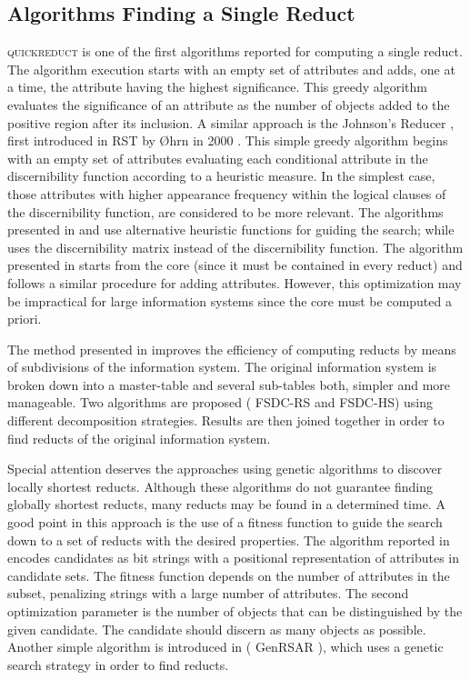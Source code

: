 \documentclass[citenumber]{llncs}
\makeatletter
\newcommand{\setword}[2]{%
  \phantomsection
  #1\def\@currentlabel{\unexpanded{#1}}\label{#2}%
}
\makeatother
\begin{document}
  \subsection{Algorithms Finding a Single Reduct}
  \setword{\textsc{quickreduct}}{quickreduct} \cite{Chouchoulas01} is one of the first algorithms reported for computing a single reduct. The algorithm execution starts with an empty set of attributes and adds, one at a time, the attribute having the highest significance. This greedy algorithm evaluates the significance of an attribute as the number of objects added to the positive region after its inclusion.  A similar approach is the Johnson's Reducer \cite{Johnson74}, first introduced in RST by  \O{}hrn in 2000 \cite{Ohrn00}. This simple greedy algorithm begins with an empty set of attributes evaluating each conditional attribute in the discernibility function according to a heuristic measure. In the simplest case, those attributes with higher appearance frequency within the logical clauses of the discernibility function, are considered to be more relevant. The algorithms presented in \cite{Nguyen97} and \cite{Wang01} use alternative heuristic functions for guiding the search; while \cite{Yang08} uses the discernibility matrix instead of the discernibility function. The algorithm presented in \cite{Zhong01} starts from the core (since it must be contained in every reduct) and follows a similar procedure for adding attributes. However, this optimization may be impractical for large information systems \cite{Jensen14} since the core must be computed a priori.
  
  The method presented in \cite{Jiao10} improves the efficiency of computing reducts by means of subdivisions of the information system. The original information system is broken down into a master-table and several sub-tables both, simpler and more manageable. Two algorithms are proposed (\setword{FSDC-RS}{FSDCRS} and FSDC-HS) using different decomposition strategies. Results are then joined together in order to find reducts of the original information system. 
    
  Special attention deserves the approaches using genetic algorithms to discover locally shortest reducts. Although 
  these algorithms do not guarantee finding globally shortest reducts, many reducts may be found in a determined
  time. A good point in this approach is the use of a fitness function to guide the search down to a set of 
  reducts with the desired properties. The algorithm reported in \cite{Wroblewski95} encodes candidates as bit 
  strings with a positional representation of attributes in candidate sets. The fitness function
  depends on the number of attributes in the subset, penalizing strings with a large number of attributes. The 
  second optimization parameter is the number of objects that can be distinguished by the given candidate. The 
  candidate should discern as many objects as possible. Another simple algorithm is introduced in \cite{Jensen03}  
  (\setword{GenRSAR}{GenRSAR}), which uses a genetic search strategy in order to find reducts.
  
\end{document}
